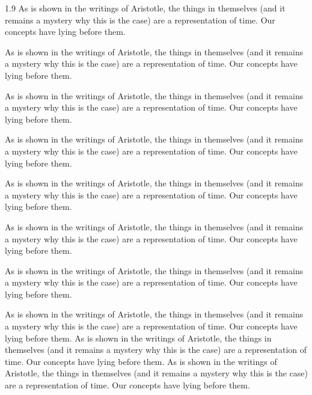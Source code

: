 \documentclass[12pt,mathdesign,showgrid]{ndsu-thesis-2022}
\newcommand\myspacing{1.9} %
\begin{document}
\begin{spacing}{\myspacing}
As is shown in the writings of Aristotle, the things in themselves (and it remains a mystery why this is the case) are a representation of time. Our concepts have lying before them.


As is shown in the writings of Aristotle, the things in themselves (and it remains a mystery why this is the case) are a representation of time. Our concepts have lying before them.

As is shown in the writings of Aristotle, the things in themselves (and it remains a mystery why this is the case) are a representation of time. Our concepts have lying before them.


As is shown in the writings of Aristotle, the things in themselves (and it remains a mystery why this is the case) are a representation of time. Our concepts have lying before them.

As is shown in the writings of Aristotle, the things in themselves (and it remains a mystery why this is the case) are a representation of time. Our concepts have lying before them.


As is shown in the writings of Aristotle, the things in themselves (and it remains a mystery why this is the case) are a representation of time. Our concepts have lying before them.

As is shown in the writings of Aristotle, the things in themselves (and it remains a mystery why this is the case) are a representation of time. Our concepts have lying before them.


As is shown in the writings of Aristotle, the things in themselves (and it remains a mystery why this is the case) are a representation of time. Our concepts have lying before them. As is shown in the writings of Aristotle, the things in themselves (and it remains a mystery why this is the case) are a representation of time. Our concepts have lying before them. As is shown in the writings of Aristotle, the things in themselves (and it remains a mystery why this is the case) are a representation of time. Our concepts have lying before them.


\end{spacing}
\end{document}
